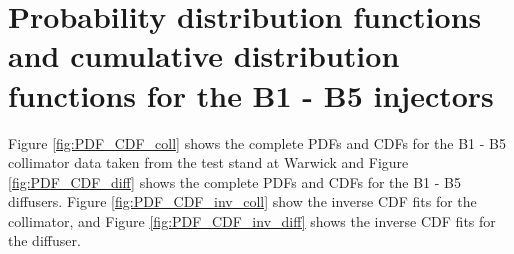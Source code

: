 \begin{figure}
    
\end{figure}


\section{Probability distribution functions and cumulative distribution functions for the B1 - B5 injectors}

Figure \ref{fig:PDF_CDF_coll} shows the complete PDFs and CDFs for the B1 - B5 collimator data taken from the test stand at Warwick and Figure \ref{fig:PDF_CDF_diff} shows the complete PDFs and CDFs for the B1 - B5 diffusers. Figure \ref{fig:PDF_CDF_inv_coll} show the inverse CDF fits for the collimator, and Figure \ref{fig:PDF_CDF_inv_diff} shows the inverse CDF fits for the diffuser. 

